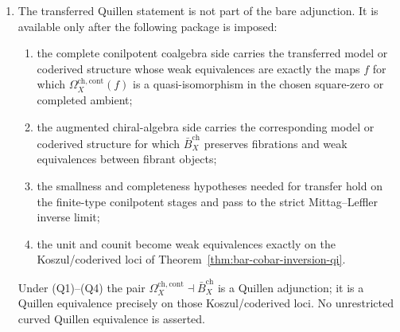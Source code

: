 \begin{proposition}
\begin{enumerate}[label=\textup{(\roman*)}]
universal twisting cochain
\[
\tau_\cC\colon \cC\longrightarrow
\Omega^{\mathrm{ch,cont}}_X(\cC),\qquad
c\longmapsto s^{-1}\bar c
\quad\textup{for }c\in\bar\cC .
\]
Equivalently, on the conilpotent finite stages,
\[
\eta_\cC(c)
=
\sum_{r\geq1}
\sum_{\bar\Delta^{(r-1)}(c)=\sum c_1\otimes\cdots\otimes c_r}
[s^{-1}c_1|\cdots|s^{-1}c_r]_{\Omega\cC},
\]
where $[-|\cdots|-]_{\Omega\cC}$ denotes a bar word in
$\bar B_X^{\mathrm{ch}}\Omega_X^{\mathrm{ch,cont}}(\cC)$. The sum is
finite on conilpotent elements and converges in the complete
filtration. For a coalgebra morphism
$v\colon\cC\to\cC'$, the naturality square
\[
\begin{tikzcd}[ampersand replacement=\&]
\cC \arrow[r,"\eta_\cC"] \arrow[d,"v"'] \&
\bar B^{\mathrm{ch}}_X\Omega^{\mathrm{ch,cont}}_X(\cC)
 \arrow[d,"\bar B_X^{\mathrm{ch}}\Omega_X^{\mathrm{ch,cont}}(v)"]\\
\cC' \arrow[r,"\eta_{\cC'}"'] \&
\bar B^{\mathrm{ch}}_X\Omega^{\mathrm{ch,cont}}_X(\cC')
\end{tikzcd}
\]
commutes.
\item The transferred Quillen statement is not part of the bare
adjunction. It is available only after the following package is
imposed:
\begin{enumerate}[label=\textup{(Q\arabic*)}]
\item the complete conilpotent coalgebra side carries the transferred
model or coderived structure whose weak equivalences are exactly the
maps $f$ for which
$\Omega_X^{\mathrm{ch,cont}}(f)$ is a quasi-isomorphism in the chosen
square-zero or completed ambient;
\item the augmented chiral-algebra side carries the corresponding
model or coderived structure for which $\bar B_X^{\mathrm{ch}}$
preserves fibrations and weak equivalences between fibrant objects;
\item the smallness and completeness hypotheses needed for transfer
hold on the finite-type conilpotent stages and pass to the strict
Mittag--Leffler inverse limit;
\item the unit and counit become weak equivalences exactly on the
Koszul/coderived loci of Theorem~\ref{thm:bar-cobar-inversion-qi}.
\end{enumerate}
Under \textup{(Q1)--(Q4)} the pair
$\Omega_X^{\mathrm{ch,cont}}\dashv\bar B_X^{\mathrm{ch}}$ is a
Quillen adjunction; it is a Quillen equivalence precisely on those
Koszul/coderived loci. No unrestricted curved Quillen equivalence is
asserted.
\end{enumerate}
\end{proposition}

